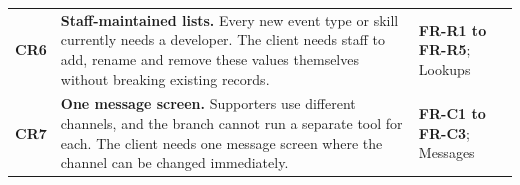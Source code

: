 \begin{xltabular}{\textwidth}{@{}L{0.06\textwidth}YL{0.28\textwidth}@{}}
\addlinespace[2pt]
\textbf{CR6} & \textbf{Staff-maintained lists.} Every new event type or skill currently needs a developer. The client needs staff to add, rename and remove these values themselves without breaking existing records. & \textbf{FR-R1 to FR-R5}; Lookups \\
\addlinespace[2pt]
\textbf{CR7} & \textbf{One message screen.} Supporters use different channels, and the branch cannot run a separate tool for each. The client needs one message screen where the channel can be changed immediately. & \textbf{FR-C1 to FR-C3}; Messages \\
\end{xltabular}
\endgroup
